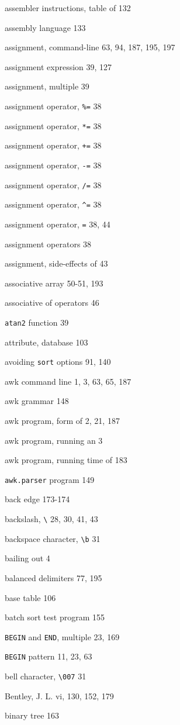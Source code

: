 \begin{multicols}{3}
assembler instructions, table of 132

assembly language 133

assignment, command-line 63, 94, 187, 195, 197

assignment expression 39, 127

assignment, multiple 39

assignment operator, \verb'%=' 38

assignment operator, \verb'*=' 38

assignment operator, \verb'+=' 38

assignment operator, \verb'-=' 38

assignment operator, \verb'/=' 38

assignment operator, \verb'^=' 38

assignment operator, \verb'=' 38, 44

assignment operators 38

assignment, side-effects of 43

associative array 50-51, 193

associative of operators 46

\verb'atan2' function 39

attribute, database 103

avoiding \verb'sort' options 91, 140

awk command line 1, 3, 63, 65, 187

awk grammar 148

awk program, form of 2, 21, 187

awk program, running an 3

awk program, running time of 183

\verb'awk.parser' program 149

back edge 173-174

backslash, \verb'\' 28, 30, 41, 43

backspace character, \verb'\b' 31

bailing out 4

balanced delimiters 77, 195

base table 106

batch sort test program 155

\verb'BEGIN' and \verb'END', multiple 23, 169

\verb'BEGIN' pattern 11, 23, 63

bell character, \verb'\007' 31

Bentley, J. L. vi, 130, 152, 179

binary tree 163


\end{multicols}
